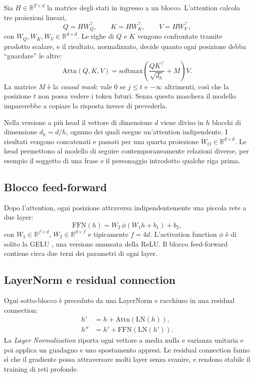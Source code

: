 Sia $H\in\mathbb{R}^{T\times d}$ la matrice degli stati in ingresso a un blocco. L'attention calcola tre proiezioni lineari,
\begin{equation}
Q = H W_Q^\top,\qquad K = H W_K^\top,\qquad V = H W_V^\top,
\end{equation}
con $W_Q,W_K,W_V\in\mathbb{R}^{d\times d}$. Le righe di $Q$ e $K$ vengono confrontate tramite prodotto scalare, e il risultato, normalizzato, decide quanto ogni posizione debba ``guardare'' le altre:
\begin{equation}
\mathrm{Attn}(Q,K,V) = \mathrm{softmax}\!\left(\frac{QK^\top}{\sqrt{d_h}} + M\right) V .
\end{equation}
La matrice $M$ è la \emph{causal mask}: vale $0$ se $j\le t$ e $-\infty$ altrimenti, così che la posizione $t$ non possa vedere i token futuri. Senza questa maschera il modello imparerebbe a copiare la risposta invece di prevederla.

Nella versione a più head il vettore di dimensione $d$ viene diviso in $h$ blocchi di dimensione $d_h=d/h$, ognuno dei quali esegue un'attention indipendente. I risultati vengono concatenati e passati per una quarta proiezione $W_O\in\mathbb{R}^{d\times d}$. Le head permettono al modello di seguire contemporaneamente relazioni diverse, per esempio il soggetto di una frase e il personaggio introdotto qualche riga prima.

\subsection{Blocco feed-forward}

Dopo l'attention, ogni posizione attraversa indipendentemente una piccola rete a due layer:
\begin{equation}
\mathrm{FFN}(h) = W_2\,\phi(W_1 h + b_1) + b_2,
\end{equation}
con $W_1\in\mathbb{R}^{f\times d}$, $W_2\in\mathbb{R}^{d\times f}$ e tipicamente $f=4d$. L'activation function $\phi$ è di solito la GELU \cite{hendrycks2016gelu}, una versione smussata della ReLU. Il blocco feed-forward contiene circa due terzi dei parametri di ogni layer.

\subsection{LayerNorm e residual connection}

Ogni sotto-blocco è preceduto da una LayerNorm e racchiuso in una residual connection:
\begin{align}
h' &= h + \mathrm{Attn}(\mathrm{LN}(h)),\\
h'' &= h' + \mathrm{FFN}(\mathrm{LN}(h')).
\end{align}
La \emph{Layer Normalization} \cite{ba2016layer} riporta ogni vettore a media nulla e varianza unitaria e poi applica un guadagno e uno spostamento appresi. Le residual connection fanno sì che il gradiente possa attraversare molti layer senza svanire, e rendono stabile il training di reti profonde.

